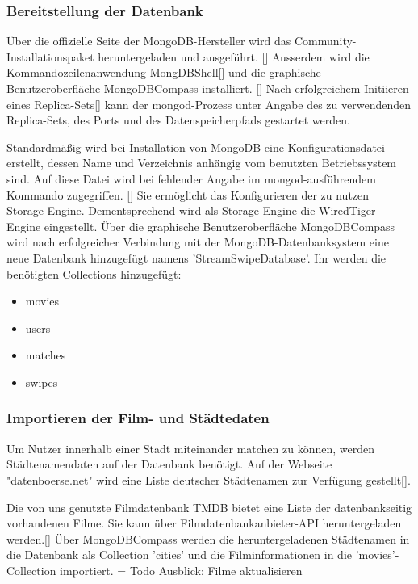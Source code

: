 \subsubsection{Bereitstellung der Datenbank}
Über die offizielle Seite der MongoDB-Hersteller wird das Community-Installationspaket heruntergeladen und ausgeführt. []
Ausserdem wird die Kommandozeilenanwendung MongDBShell[] und die
graphische Benutzeroberfläche MongoDBCompass installiert. []
Nach erfolgreichem Initiieren eines Replica-Sets[]
kann der mongod-Prozess unter Angabe des zu verwendenden Replica-Sets, des Ports und des Datenspeicherpfads gestartet werden. \newline


\noindent
Standardmäßig wird bei Installation von MongoDB eine Konfigurationsdatei erstellt, dessen Name und Verzeichnis anhängig vom benutzten Betriebssystem sind. Auf diese Datei wird bei fehlender Angabe im mongod-ausführendem Kommando zugegriffen. [] 
Sie ermöglicht das Konfigurieren der zu nutzen Storage-Engine. Dementsprechend wird als Storage Engine die WiredTiger-Engine eingestellt. 
Über die graphische Benutzeroberfläche MongoDBCompass wird nach erfolgreicher Verbindung mit der MongoDB-Datenbanksystem eine neue Datenbank hinzugefügt namens 'StreamSwipeDatabase'. Ihr werden die benötigten Collections hinzugefügt:

\begin{itemize}
\item movies
\item users
\item matches
\item swipes
\end{itemize}

\subsubsection{Importieren der Film- und Städtedaten}
Um Nutzer innerhalb einer Stadt miteinander matchen zu können, werden Städtenamendaten auf der Datenbank benötigt. Auf der Webseite "datenboerse.net" wird eine Liste deutscher Städtenamen zur Verfügung gestellt[].\newline

\noindent
Die von uns genutzte Filmdatenbank TMDB bietet eine Liste der datenbankseitig vorhandenen Filme. Sie kann über Filmdatenbankanbieter-API heruntergeladen werden.[]
\newline
Über MongoDBCompass werden die heruntergeladenen Städtenamen in die Datenbank als Collection 'cities' und die Filminformationen in die 'movies'-Collection importiert.
\newline
=\> Todo Ausblick: Filme aktualisieren
